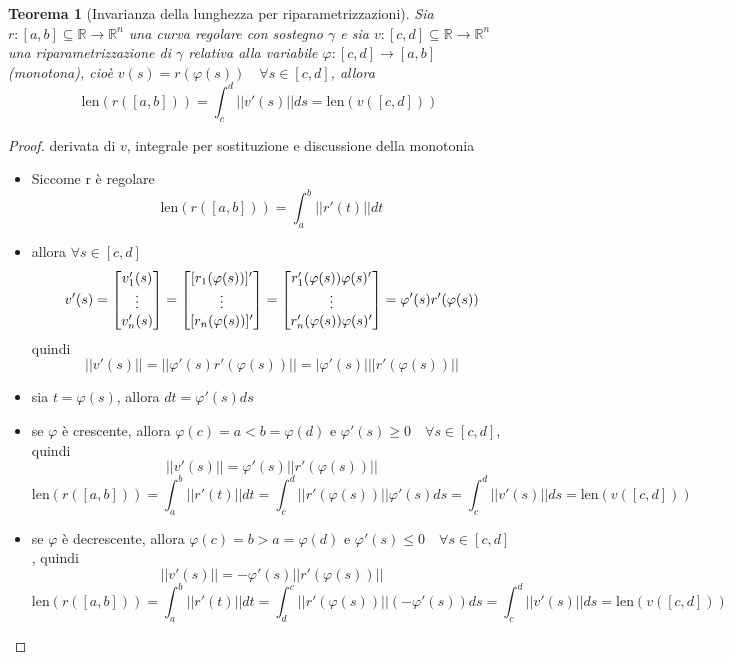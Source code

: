 \documentclass[12pt, a4paper]{article}
\theoremstyle{break}
\newtheorem{theorem}{Teorema} %
\begin{document}
\newpage
\begin{theorem} [Invarianza della lunghezza per riparametrizzazioni]
	Sia $r: [a,b] \subseteq \mathbb{R} \to \mathbb{R}^n$ una curva
	regolare con sostegno $\gamma$ e sia $v: [c,d] \subseteq \mathbb{R}
		\to \mathbb{R}^n$ una riparametrizzazione di $\gamma$ relativa
	alla variabile $ \varphi : [c,d] \to [a,b]$ (monotona), cioè
	$v(s) = r(\varphi (s)) \quad \forall s \in [c,d]$, allora
	\[
		\text{len}(r([a,b])) = \int_{c}^{d} || v'(s) || ds =
		\text{len}(v([c,d])) \]
\end{theorem}
\begin{proof} derivata di $v$, integrale per sostituzione e discussione della
	monotonia
	\begin{itemize}
		\item Siccome r è regolare
			\[
				\text{len}(r([a,b])) = \int_{a}^{b} || r'(t) || dt
			\]
		\item allora $\forall s \in [c,d]$
			\[
				v'(s) =
				\begin{bmatrix}
					v_1'(s) \\
					\vdots  \\
					v_n'(s) \\
				\end{bmatrix}
				=
				\begin{bmatrix}
					[r_1(\varphi(s))]' \\
					\vdots             \\
					[r_n(\varphi(s))]' \\
				\end{bmatrix}
				=
				\begin{bmatrix}
					r_1'(\varphi(s))\varphi(s)' \\
					\vdots                      \\
					r_n'(\varphi(s))\varphi(s)' \\
				\end{bmatrix}
				= \varphi'(s) r'(\varphi(s))\\
			\]
			quindi
			\[
				||v'(s)|| = ||\varphi'(s) r'(\varphi(s))|| = |\varphi'(s)| ||
				r'(\varphi(s))||
			\]
		\item sia $t = \varphi(s)$, allora $ dt = \varphi'(s) ds$
		\item se $\varphi$ è crescente, allora $\varphi(c) = a < b =
				\varphi(d)$ e $\varphi'(s) \geq 0 \quad \forall s \in [c,d]$,
			quindi
			\[
				||v'(s)|| = \varphi'(s) || r'(\varphi(s))||
			\]
			\[
				\text{len}(r([a,b])) =
				\int_{a}^{b} || r'(t) || dt =
				\int_{c}^{d} || r'(\varphi(s))|| \varphi'(s) ds =
				\int_{c}^{d} || v'(s) || ds =
				\text{len}(v([c,d]))
			\]
		\item se $\varphi$ è decrescente, allora $\varphi(c) = b > a =
				\varphi(d)$ e $\varphi'(s) \leq 0 \quad \forall s \in [c,d]$,
			quindi
			\[
				||v'(s)|| = -\varphi'(s) || r'(\varphi(s))||
			\]
			\[
				\text{len}(r([a,b])) =
				\int_{a}^{b} || r'(t) || dt =
				\int_{d}^{c} || r'(\varphi(s))|| (-\varphi'(s)) ds =
				\int_{c}^{d} || v'(s) || ds =
				\text{len}(v([c,d]))
			\]
	\end{itemize}
\end{proof}
\end{document}
